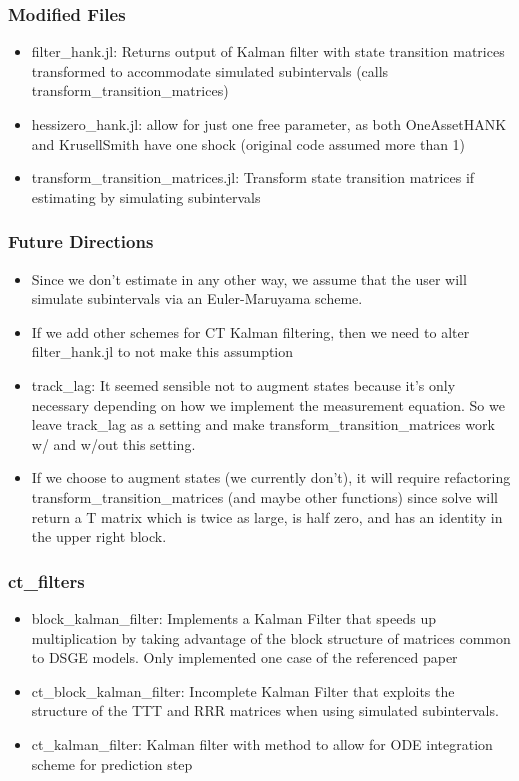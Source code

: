 \documentclass{beamer}
\begin{document}
\begin{frame}
\frametitle{Modified Files}
\begin{itemize}
\item filter\_hank.jl: Returns output of Kalman filter with state transition matrices transformed to accommodate simulated subintervals (calls transform\_transition\_matrices)
\item hessizero\_hank.jl: allow for just one free parameter, as both OneAssetHANK and KrusellSmith have one shock (original code assumed more than 1)
\item transform\_transition\_matrices.jl: Transform state transition matrices if estimating by simulating subintervals
\end{itemize}
\end{frame}
\begin{frame}
  \frametitle{Future Directions}
\begin{itemize}
\item Since we don't estimate in any other way, we assume that the user will simulate subintervals via an Euler-Maruyama scheme.
\item If we add other schemes for CT Kalman filtering, then we need to alter filter\_hank.jl to not make this assumption
\item track\_lag: It seemed sensible not to augment states because it's only necessary depending on how we implement the measurement equation. So we leave track\_lag as a setting and make transform\_transition\_matrices work w/ and w/out this setting.
\item If we choose to augment states (we currently don't), it will require refactoring transform\_transition\_matrices (and maybe other functions) since solve will return a T matrix which is twice as large, is half zero, and has an identity in the upper right block.
\end{itemize}
\end{frame}
\begin{frame}
\frametitle{ct\_filters}
\begin{itemize}
\item block\_kalman\_filter: Implements a Kalman Filter that speeds up multiplication by taking advantage of the block structure of matrices common to DSGE models. Only implemented one case of the referenced paper
\item ct\_block\_kalman\_filter: Incomplete Kalman Filter that exploits the structure of the TTT and RRR matrices when using simulated subintervals.
\item ct\_kalman\_filter: Kalman filter with method to allow for ODE integration scheme for prediction step
\end{itemize}
\end{frame}
\end{document}
